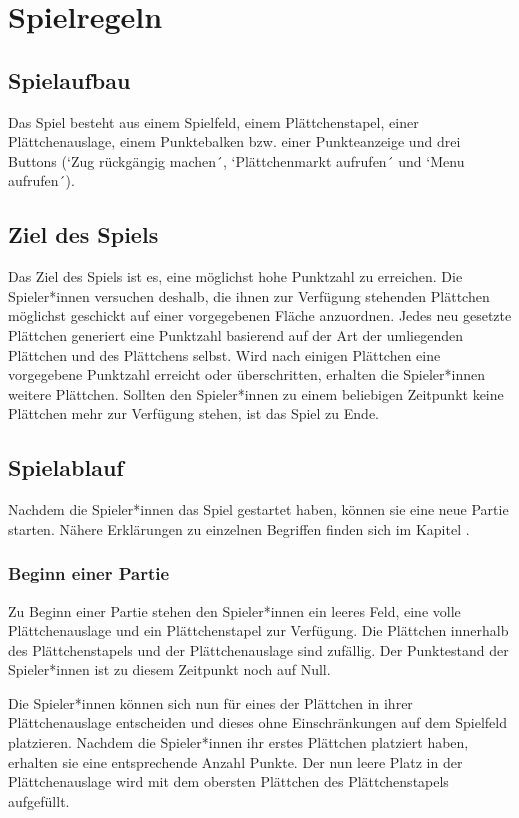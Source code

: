 \documentclass[../main.tex]{subfiles}
\begin{document}
	\section{Spielregeln}
	\label{section:Spielregeln}
	\subsection{Spielaufbau}
	\par Das Spiel besteht aus einem Spielfeld, einem Plättchenstapel, einer Plättchenauslage, einem Punktebalken bzw. einer Punkteanzeige und drei Buttons (`Zug rückgängig machen´, `Plättchenmarkt aufrufen´ und `Menu aufrufen´). 
	
	\subsection{Ziel des Spiels}
	\par Das Ziel des Spiels ist es, eine möglichst hohe Punktzahl zu erreichen. Die Spieler*innen versuchen deshalb, die ihnen zur Verfügung stehenden Plättchen möglichst geschickt auf einer vorgegebenen Fläche anzuordnen. Jedes neu gesetzte Plättchen generiert eine Punktzahl basierend auf der Art der umliegenden Plättchen und des Plättchens selbst. Wird nach einigen Plättchen eine vorgegebene Punktzahl erreicht oder überschritten, erhalten die Spieler*innen weitere Plättchen. Sollten den Spieler*innen zu einem beliebigen Zeitpunkt keine Plättchen mehr zur Verfügung stehen, ist das Spiel zu Ende.
	
	\subsection{Spielablauf}
	\par Nachdem die Spieler*innen das Spiel gestartet haben, können sie eine neue Partie starten. Nähere Erklärungen zu einzelnen Begriffen finden sich im Kapitel .
	\subsubsection{Beginn einer Partie}
	\par Zu Beginn einer Partie stehen den Spieler*innen ein leeres Feld, eine volle Plättchenauslage und ein Plättchenstapel zur Verfügung. Die Plättchen innerhalb des Plättchenstapels und der Plättchenauslage sind zufällig. Der Punktestand der Spieler*innen ist zu diesem Zeitpunkt noch auf Null.
	\par Die Spieler*innen können sich nun für eines der Plättchen in ihrer Plättchenauslage entscheiden und dieses ohne Einschränkungen auf dem Spielfeld platzieren. Nachdem die Spieler*innen ihr erstes Plättchen platziert haben, erhalten sie eine entsprechende Anzahl Punkte. Der nun leere Platz in der Plättchenauslage wird mit dem obersten Plättchen des Plättchenstapels aufgefüllt.
\end{document}
